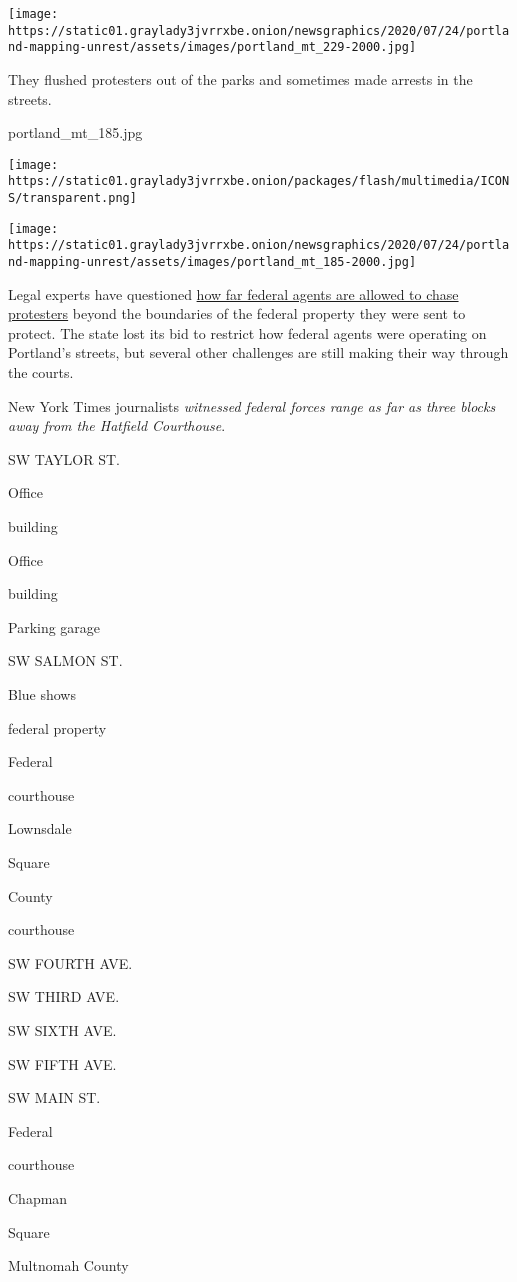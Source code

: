 \texttt{[image: https://static01.graylady3jvrrxbe.onion/newsgraphics/2020/07/24/portland-mapping-unrest/assets/images/portland\_mt\_229-2000.jpg]}

They flushed protesters out of the parks and sometimes made arrests in
the streets.

portland\_mt\_185.jpg

\texttt{[image: https://static01.graylady3jvrrxbe.onion/packages/flash/multimedia/ICONS/transparent.png]}

\texttt{[image: https://static01.graylady3jvrrxbe.onion/newsgraphics/2020/07/24/portland-mapping-unrest/assets/images/portland\_mt\_185-2000.jpg]}

Legal experts have questioned
\href{https://www.nytimes3xbfgragh.onion/2020/07/25/us/portland-federal-legal-jurisdiction-courts.html}{how
far federal agents are allowed to chase protesters} beyond the
boundaries of the federal property they were sent to protect. The state
lost its bid to restrict how federal agents were operating on Portland's
streets, but several other challenges are still making their way through
the courts.

New York Times journalists \emph{witnessed federal forces range as far
as three blocks away from the Hatfield Courthouse}.

SW TAYLOR ST.

Office

building

Office

building

Parking garage

SW SALMON ST.

Blue shows

federal property

Federal

courthouse

Lownsdale

Square

County

courthouse

SW FOURTH AVE.

SW THIRD AVE.

SW SIXTH AVE.

SW FIFTH AVE.

SW MAIN ST.

Federal

courthouse

Chapman

Square

Multnomah County

